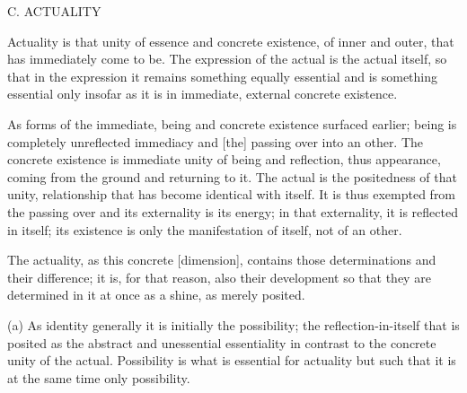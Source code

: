 C. ACTUALITY

Actuality is that unity of essence and concrete existence,
of inner and outer, that has immediately come to be.
The expression of the actual is the actual itself,
so that in the expression it remains something equally essential
and is something essential only insofar as it is
in immediate, external concrete existence.

    As forms of the immediate,
    being and concrete existence surfaced earlier;
    being is completely unreflected immediacy and
    [the] passing over into an other.
    The concrete existence is immediate unity of
    being and reflection, thus appearance,
    coming from the ground and returning to it.
    The actual is the positedness of that unity,
    relationship that has become identical with itself.
    It is thus exempted from the passing over and
    its externality is its energy;
    in that externality, it is reflected in itself;
    its existence is only the manifestation of itself,
    not of an other.

The actuality, as this concrete [dimension],
contains those determinations and their difference;
it is, for that reason, also their development
so that they are determined in it at once
as a shine, as merely posited.

(a) As identity generally it is initially the possibility;
the reflection-in-itself that is posited as
the abstract and unessential essentiality
in contrast to the concrete unity of the actual.
Possibility is what is essential for actuality but
such that it is at the same time only possibility.

